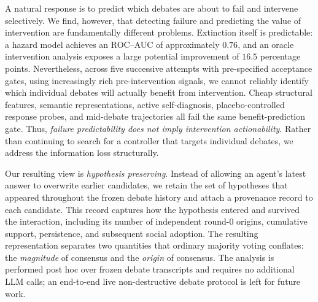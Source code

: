 A natural response is to predict which debates are about to fail and intervene selectively. We find, however, that detecting failure and predicting the value of intervention are fundamentally different problems. Extinction itself is predictable: a hazard model achieves an ROC--AUC of approximately $0.76$, and an oracle intervention analysis exposes a large potential improvement of $16.5$ percentage points. Nevertheless, across five successive attempts with pre-specified acceptance gates, using increasingly rich pre-intervention signals, we cannot reliably identify which individual debates will actually benefit from intervention. Cheap structural features, semantic representations, active self-diagnosis, placebo-controlled response probes, and mid-debate trajectories all fail the same benefit-prediction gate. Thus, \emph{failure predictability does not imply intervention actionability}. Rather than continuing to search for a controller that targets individual debates, we address the information loss structurally.

Our resulting view is \emph{hypothesis preserving}. Instead of allowing an agent's latest answer to overwrite earlier candidates, we retain the set of hypotheses that appeared throughout the frozen debate history and attach a provenance record to each candidate. This record captures how the hypothesis entered and survived the interaction, including its number of independent round-$0$ origins, cumulative support, persistence, and subsequent social adoption. The resulting representation separates two quantities that ordinary majority voting conflates: the \emph{magnitude} of consensus and the \emph{origin} of consensus. The analysis is performed post hoc over frozen debate transcripts and requires no additional LLM calls; an end-to-end live non-destructive debate protocol is left for future work.

